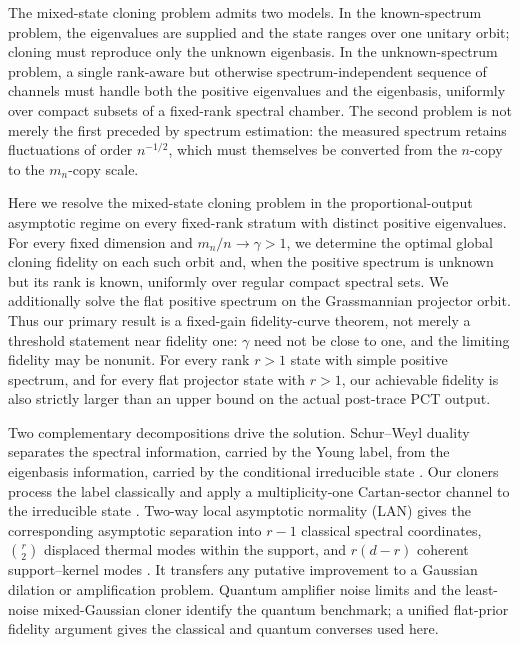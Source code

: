 \documentclass[11pt]{article}
\theoremstyle{remark}
\theoremstyle{plain}
\begin{document}
The mixed-state cloning problem admits two models.  In the known-spectrum problem, the
eigenvalues are supplied and the state ranges over one unitary orbit; cloning
must reproduce only the unknown eigenbasis.  In the unknown-spectrum problem,
a single rank-aware but otherwise spectrum-independent sequence of channels
must handle both the positive eigenvalues and the eigenbasis, uniformly over
compact subsets of a fixed-rank spectral chamber.
The second problem is not merely the first preceded by spectrum estimation:
the measured spectrum retains fluctuations of order \(n^{-1/2}\), which must
themselves be converted from the \(n\)-copy to the \(m_n\)-copy scale.

Here we resolve the mixed-state cloning problem in the proportional-output
asymptotic regime on every fixed-rank stratum with distinct positive
eigenvalues.  For every fixed dimension and \(m_n/n\to\gamma>1\), we
determine the optimal global cloning fidelity on each such orbit and, when
the positive spectrum is unknown but its rank is known, uniformly over
regular compact spectral sets.  We additionally solve the flat positive
spectrum on the Grassmannian projector orbit.
Thus our primary result is a fixed-gain fidelity-curve theorem, not merely a
threshold statement near fidelity one: \(\gamma\) need not be close to one,
and the limiting fidelity may be nonunit.  For every rank \(r>1\) state with
simple positive spectrum, and for every flat projector state with \(r>1\),
our achievable fidelity is also strictly larger than an upper bound on the
actual post-trace PCT output.

Two complementary decompositions drive the solution.  Schur--Weyl duality
separates the spectral information, carried by the Young label, from the
eigenbasis information, carried by the conditional irreducible state
\cite{KeylWerner2001Spectrum}.  Our cloners process the label classically and
apply a multiplicity-one Cartan-sector channel to the irreducible state
\cite{ParthasarathyRangaRaoVaradarajan1967,FultonHarris1991}.
Two-way local asymptotic normality (LAN) gives the corresponding asymptotic
separation into \(r-1\) classical spectral coordinates,
\(\binom r2\) displaced thermal modes within the support, and
\(r(d-r)\) coherent support--kernel modes
\cite{GutaJencova2007LAN,GutaKahn2006LANQubits,
KahnGuta2009LANFiniteDimensional,LahiryNussbaum2024}.
It transfers any putative improvement to a Gaussian dilation or amplification
problem.  Quantum amplifier noise limits
\cite{Caves1982LinearAmplifiers} and the least-noise mixed-Gaussian cloner
\cite{GutaMatsumoto2006MixedGaussianCloning} identify the quantum benchmark;
a unified flat-prior fidelity argument gives the classical and quantum
converses used here.
\end{document}
